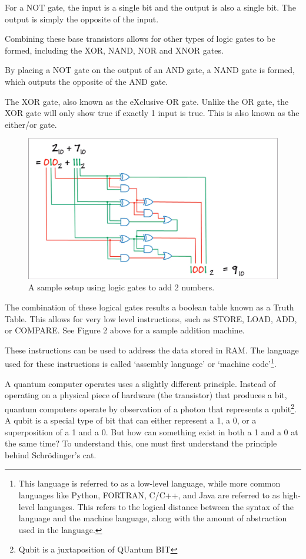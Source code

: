 \documentclass[10pt,journal,compsoc]{IEEEtran}
\begin{document}
For a NOT gate, the input is a single bit and the output is also a single bit. The output is simply the opposite of the input. 

Combining these base transistors allows for other types of logic gates to be formed, including the XOR, NAND, NOR and XNOR gates.

 By placing a NOT gate on the output of an AND gate, a NAND gate is formed, which outputs the opposite of the AND gate. 

The XOR gate, also known as the eXclusive OR gate. Unlike the OR gate, the XOR gate will only show true if exactly 1 input is true. This is also known as the either/or gate.
\begin{figure}
	\centering
	\includegraphics[width=0.7\linewidth]{adder}
	\caption{A sample setup using logic gates to add 2 numbers\cite{Essence}.}
	\label{ .}
\end{figure}


The combination of these logical gates results a boolean table known as a Truth Table\cite{Surrey}. This allows for very low level instructions, such as STORE, LOAD, ADD, or COMPARE. See Figure 2 above for a sample addition machine.

These instructions can be used to address the data stored in RAM. The language used for these instructions is called `assembly language' or `machine code'\footnote{This language is referred to as a low-level language, while more common languages like Python, FORTRAN, C/C++, and Java are referred to as high-level languages. This refers to the logical distance between the syntax of the language and the machine language, along with the amount of abstraction used in the language.}.

A quantum computer operates uses a slightly different principle. Instead of operating on a physical piece of hardware (the transistor) that produces a bit, quantum computers operate by observation of a photon that represents a qubit\footnote{Qubit is a juxtaposition of QUantum BIT}. A qubit is a special type of bit that can either represent a 1, a 0, or a superposition of a 1 and a 0. But how can something exist in both a 1 and a 0 at the same time? To understand this, one must first understand the principle behind Schr\"{o}dinger’s cat. 
\end{document}
